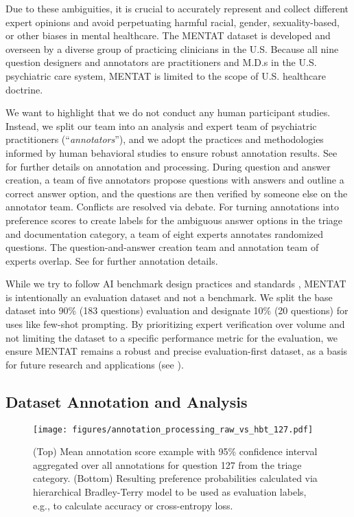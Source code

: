 Due to these ambiguities, it is crucial to accurately represent and collect different expert opinions and avoid perpetuating harmful racial, gender, sexuality-based, or other biases in mental healthcare.
The MENTAT dataset is developed and overseen by a diverse group of practicing clinicians in the U.S.
Because all nine question designers and annotators are practitioners and M.D.s in the U.S. psychiatric care system, MENTAT is limited to the scope of U.S. healthcare doctrine. 

We want to highlight that we do not conduct any human participant studies. 
Instead, we split our team into an analysis and expert team of psychiatric practitioners (``\textit{annotators}''), and we adopt the practices and methodologies informed by human behavioral studies to ensure robust annotation results. 
See  for further details on annotation and processing.
During question and answer creation, a team of five 
annotators propose questions with answers and outline a correct answer option, and the questions are then verified by someone else on the 
annotator team. 
Conflicts are resolved via debate.
For turning annotations into preference scores to create labels for the ambiguous answer options in the triage and documentation category, a team of eight experts annotates randomized questions. 
The question-and-answer creation team and annotation team of experts overlap.
See  for further annotation details.

While we try to follow AI benchmark design practices and standards \citep[e.g.][]{mcintosh2024inadequacies, reuel_hardy_2024}, MENTAT is intentionally an evaluation dataset and not a benchmark.
We split the base dataset into 90\% (183 questions) evaluation and designate 10\% (20 questions) for uses like few-shot prompting.
By prioritizing expert verification over volume and not limiting the dataset to a specific performance metric for the evaluation, we ensure MENTAT remains a robust and precise evaluation-first dataset, as a basis for future research and applications (see ).

\subsection{Dataset Annotation and Analysis}
\label{sec:3_2_data_annotaiton}

\begin{figure}[ht]
    \vskip 0.2in
    \begin{center}
    \centerline{\texttt{[image: figures/annotation\_processing\_raw\_vs\_hbt\_127.pdf]}}
    \caption{(Top) Mean annotation score example with 95\% confidence interval aggregated over all annotations for question 127 from the triage category. (Bottom) Resulting preference probabilities calculated via hierarchical Bradley-Terry model to be used as evaluation labels, e.g., to calculate accuracy or cross-entropy loss.}
    \label{fig:annotation_processing_raw_vs_hbt}
    \end{center}
    \vskip -0.2in
\end{figure}



